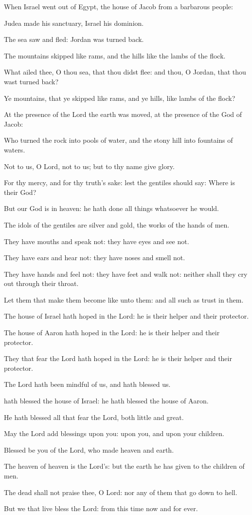 \item When Israel went out of Egypt, the house of Jacob from a barbarous people:
\item Judea made his sanctuary, Israel his dominion.
\item The sea saw and fled: Jordan was turned back.
\item The mountains skipped like rams, and the hills like the lambs of the flock.
\item What ailed thee, O thou sea, that thou didst flee: and thou, O Jordan, that thou wast turned back?
\item Ye mountains, that ye skipped like rams, and ye hills, like lambs of the flock?
\item At the presence of the Lord the earth was moved, at the presence of the God of Jacob:
\item Who turned the rock into pools of water, and the stony hill into fountains of waters.
\item Not to us, O Lord, not to us; but to thy name give glory.
\item For thy mercy, and for thy truth's sake: lest the gentiles should say: Where is their God?
\item But our God is in heaven: he hath done all things whatsoever he would.
\item The idols of the gentiles are silver and gold, the works of the hands of men.
\item They have mouths and speak not: they have eyes and see not.
\item They have ears and hear not: they have noses and smell not.
\item They have hands and feel not: they have feet and walk not: neither shall they cry out through their throat.
\item Let them that make them become like unto them: and all such as trust in them.
\item The house of Israel hath hoped in the Lord: he is their helper and their protector.
\item The house of Aaron hath hoped in the Lord: he is their helper and their protector.
\item They that fear the Lord hath hoped in the Lord: he is their helper and their protector.
\item The Lord hath been mindful of us, and hath blessed us.
\item hath blessed the house of Israel: he hath blessed the house of Aaron.
\item He hath blessed all that fear the Lord, both little and great.
\item May the Lord add blessings upon you: upon you, and upon your children.
\item Blessed be you of the Lord, who made heaven and earth.
\item The heaven of heaven is the Lord's: but the earth he has given to the children of men.
\item The dead shall not praise thee, O Lord: nor any of them that go down to hell.
\item But we that live bless the Lord: from this time now and for ever.